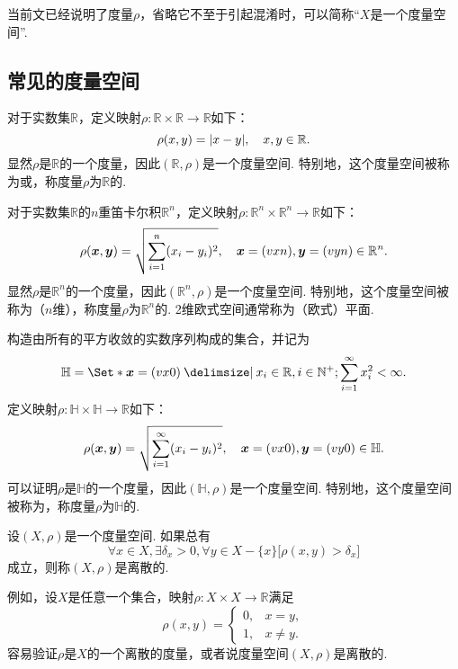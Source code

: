 当前文已经说明了度量\(\rho\)，省略它不至于引起混淆时，可以简称“\(X\)是一个度量空间”.

\subsection{常见的度量空间}
\begin{example}
对于实数集\(\mathbb{R}\)，定义映射\(\rho\colon\mathbb{R}\times\mathbb{R}\to\mathbb{R}\)如下：\[
\rho(x,y) = \abs{x-y},
\quad x,y\in\mathbb{R}.
\]显然\(\rho\)是\(\mathbb{R}\)的一个度量，因此\((\mathbb{R},\rho)\)是一个度量空间.
特别地，这个度量空间被称为或，称度量\(\rho\)为\(\mathbb{R}\)的.
\end{example}

\begin{example}
对于实数集\(\mathbb{R}\)的\(n\)重笛卡尔积\(\mathbb{R}^n\)，定义映射\(\rho\colon\mathbb{R}^n\times\mathbb{R}^n\to\mathbb{R}\)如下：\[
\rho(\boldsymbol{x},\boldsymbol{y}) = \sqrt{\sum\limits_{i=1}^n (x_i-y_i)^2},
\quad \boldsymbol{x}=(v{x}{n}),\boldsymbol{y}=(v{y}{n})\in\mathbb{R}^n.
\]显然\(\rho\)是\(\mathbb{R}^n\)的一个度量，因此\((\mathbb{R}^n,\rho)\)是一个度量空间.
特别地，这个度量空间被称为（\(n\)维），称度量\(\rho\)为\(\mathbb{R}^n\)的.
2维欧式空间通常称为（欧式）平面.
\end{example}

\begin{example}
构造由所有的平方收敛的实数序列构成的集合，并记为\[
\mathbb{H}
= \Set*{
\mat{x}=(\v{x}{0})
\given
x_i\in\mathbb{R},
i\in\mathbb{N}^+;
\sum\limits_{i=1}^\infty x_i^2<\infty
}.
\]定义映射\(\rho\colon\mathbb{H}\times\mathbb{H}\to\mathbb{R}\)如下：\[
\rho(\boldsymbol{x},\boldsymbol{y}) = \sqrt{\sum\limits_{i=1}^\infty (x_i-y_i)^2},
\quad \boldsymbol{x}=(v{x}{0}),\boldsymbol{y}=(v{y}{0})\in\mathbb{H}.
\]可以证明\(\rho\)是\(\mathbb{H}\)的一个度量，因此\((\mathbb{H},\rho)\)是一个度量空间.
特别地，这个度量空间被称为，称度量\(\rho\)为\(\mathbb{H}\)的.
\end{example}

\begin{example}[离散度量空间]
设\((X,\rho)\)是一个度量空间.
如果总有\[
\forall x \in X,
\exists \delta_x > 0,
\forall y \in X - \{x\}
\bigl[
\rho(x,y) > \delta_x
\bigr]
\]成立，则称\((X,\rho)\)是离散的.

例如，设\(X\)是任意一个集合，映射\(\rho\colon X \times X\to\mathbb{R}\)满足\[
\rho(x,y) = \left\{ \begin{array}{ll}
0, & x=y, \\
1, & x\neq y.
\end{array} \right.
\]容易验证\(\rho\)是\(X\)的一个离散的度量，或者说度量空间\((X,\rho)\)是离散的.
\end{example}

